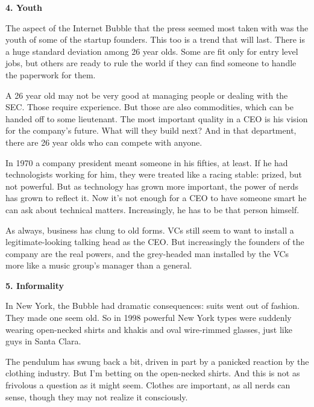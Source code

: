 \textbf{4. Youth}

The
                  aspect of the Internet Bubble that the press seemed most taken
                  with was the youth of some of the startup founders. This too
                  is a trend that will last. There is a huge standard deviation
                  among 26 year olds. Some are fit only for entry level jobs,
                  but others are ready to rule the world if they can find
                  someone to handle the paperwork for them.

A 26 year
                  old may not be very good at managing people or dealing with
                  the SEC. Those require experience. But those are also
                  commodities, which can be handed off to some lieutenant. The
                  most important quality in a CEO is his vision for the
                  company's future. What will they build next? And in that
                  department, there are 26 year olds who can compete with
                  anyone.

In 1970 a company president meant someone
                  in his fifties, at least. If he had technologists working for
                  him, they were treated like a racing stable: prized, but not
                  powerful. But as technology has grown more important, the
                  power of nerds has grown to reflect it. Now it's not enough
                  for a CEO to have someone smart he can ask about technical
                  matters. Increasingly, he has to be that person himself.

As
                  always, business has clung to old forms. VCs still seem to
                  want to install a legitimate-looking talking head as the CEO.
                  But increasingly the founders of the company are the real
                  powers, and the grey-headed man installed by the VCs more like
                  a music group's manager than a general.

\textbf{5. Informality}

In New York, the Bubble had dramatic
                  consequences: suits went out of fashion. They made one seem
                  old. So in 1998 powerful New York types were suddenly wearing
                  open-necked shirts and khakis and oval wire-rimmed glasses,
                  just like guys in Santa Clara.

The pendulum has
                  swung back a bit, driven in part by a panicked reaction by the
                  clothing industry. But I'm betting on the open-necked shirts.
                  And this is not as frivolous a question as it might seem.
                  Clothes are important, as all nerds can sense, though they may
                  not realize it consciously.


